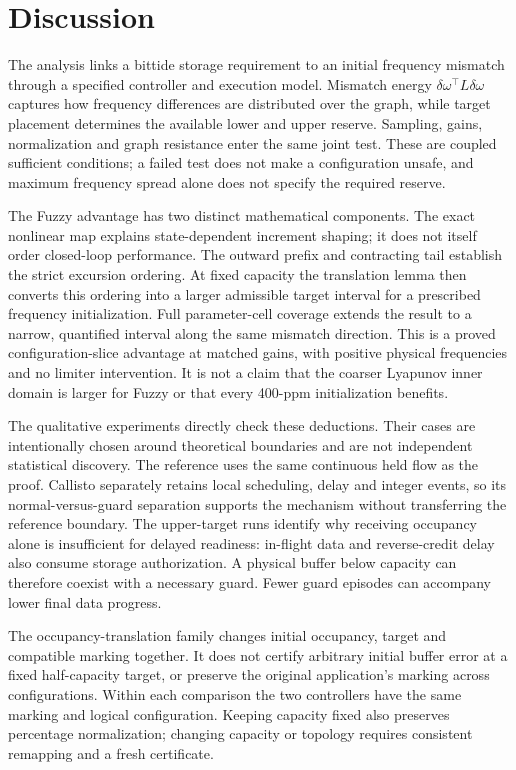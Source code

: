 \section{Discussion}
\label{sec:discussion}

The analysis links a bittide storage requirement to an initial
frequency mismatch through a specified controller and execution
model. Mismatch energy $\delta\omega^\top L\delta\omega$ captures
how frequency differences are distributed over the graph, while
target placement determines the available lower and upper reserve.
Sampling, gains, normalization and graph resistance enter the same
joint test. These are coupled sufficient conditions; a failed test
does not make a configuration unsafe, and maximum frequency spread
alone does not specify the required reserve.

The Fuzzy advantage has two distinct mathematical components.
The exact nonlinear map explains state-dependent increment shaping;
it does not itself order closed-loop performance. The outward
prefix and contracting tail establish the strict excursion ordering.
At fixed capacity the translation lemma then converts this ordering
into a larger admissible target interval for a prescribed frequency
initialization. Full parameter-cell coverage extends the result to
a narrow, quantified interval along the same mismatch direction.
This is a proved configuration-slice advantage at matched gains,
with positive physical frequencies and no limiter intervention.
It is not a claim that the coarser Lyapunov inner domain is larger
for Fuzzy or that every 400-ppm initialization benefits.

The qualitative experiments directly check these deductions. Their
cases are intentionally chosen around theoretical boundaries and
are not independent statistical discovery. The reference uses the
same continuous held flow as the proof. Callisto separately retains
local scheduling, delay and integer events, so its normal-versus-guard
separation supports the mechanism without transferring the reference
boundary. The upper-target runs identify why receiving occupancy
alone is insufficient for delayed readiness: in-flight data and
reverse-credit delay also consume storage authorization. A physical
buffer below capacity can therefore coexist with a necessary guard.
Fewer guard episodes can accompany lower final data progress.

The occupancy-translation family changes initial occupancy, target
and compatible marking together. It does not certify arbitrary
initial buffer error at a fixed half-capacity target, or preserve
the original application's marking across configurations. Within
each comparison the two controllers have the same marking and
logical configuration. Keeping capacity fixed also preserves
percentage normalization; changing capacity or topology requires
consistent remapping and a fresh certificate.

